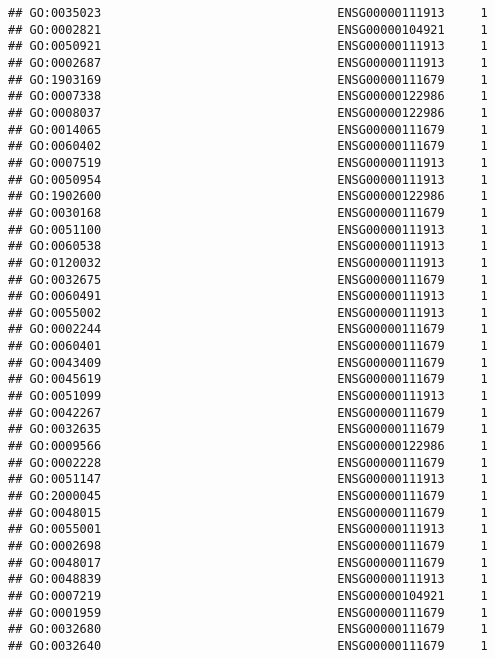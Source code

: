 \documentclass[
]{article}
\begin{document}
\begin{verbatim}
## GO:0035023                                 ENSG00000111913     1
## GO:0002821                                 ENSG00000104921     1
## GO:0050921                                 ENSG00000111913     1
## GO:0002687                                 ENSG00000111913     1
## GO:1903169                                 ENSG00000111679     1
## GO:0007338                                 ENSG00000122986     1
## GO:0008037                                 ENSG00000122986     1
## GO:0014065                                 ENSG00000111679     1
## GO:0060402                                 ENSG00000111679     1
## GO:0007519                                 ENSG00000111913     1
## GO:0050954                                 ENSG00000111913     1
## GO:1902600                                 ENSG00000122986     1
## GO:0030168                                 ENSG00000111679     1
## GO:0051100                                 ENSG00000111913     1
## GO:0060538                                 ENSG00000111913     1
## GO:0120032                                 ENSG00000111913     1
## GO:0032675                                 ENSG00000111679     1
## GO:0060491                                 ENSG00000111913     1
## GO:0055002                                 ENSG00000111913     1
## GO:0002244                                 ENSG00000111679     1
## GO:0060401                                 ENSG00000111679     1
## GO:0043409                                 ENSG00000111679     1
## GO:0045619                                 ENSG00000111679     1
## GO:0051099                                 ENSG00000111913     1
## GO:0042267                                 ENSG00000111679     1
## GO:0032635                                 ENSG00000111679     1
## GO:0009566                                 ENSG00000122986     1
## GO:0002228                                 ENSG00000111679     1
## GO:0051147                                 ENSG00000111913     1
## GO:2000045                                 ENSG00000111679     1
## GO:0048015                                 ENSG00000111679     1
## GO:0055001                                 ENSG00000111913     1
## GO:0002698                                 ENSG00000111679     1
## GO:0048017                                 ENSG00000111679     1
## GO:0048839                                 ENSG00000111913     1
## GO:0007219                                 ENSG00000104921     1
## GO:0001959                                 ENSG00000111679     1
## GO:0032680                                 ENSG00000111679     1
## GO:0032640                                 ENSG00000111679     1

\end{verbatim}
\end{document}
